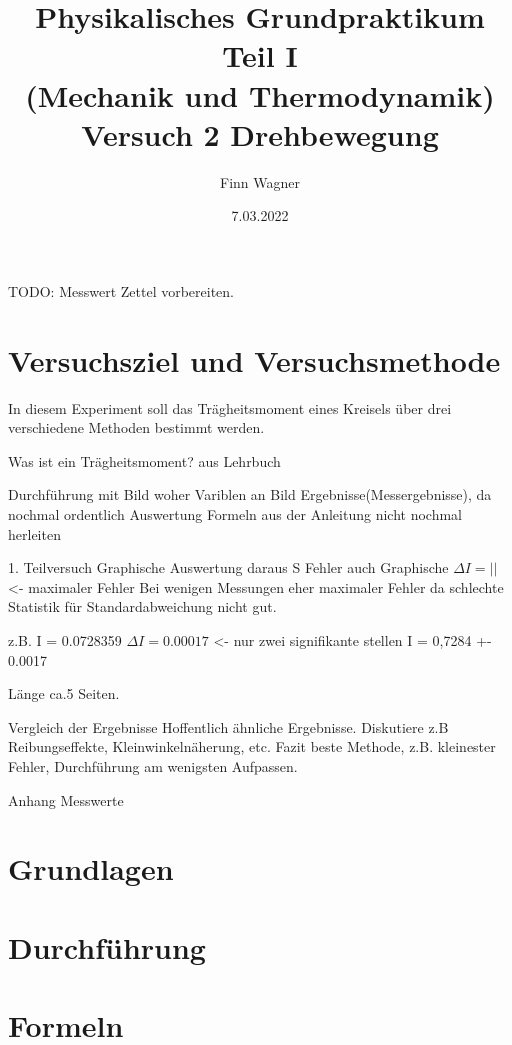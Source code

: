 \documentclass{article}
\date{7.03.2022}
\title{Physikalisches Grundpraktikum Teil I \\ (Mechanik und Thermodynamik) \\ Versuch 2 Drehbewegung}
\author{Finn Wagner}
\begin{document}
    \maketitle

    TODO: Messwert Zettel vorbereiten.
    \section{Versuchsziel und Versuchsmethode}
      In diesem Experiment soll das Trägheitsmoment eines Kreisels über drei verschiedene Methoden bestimmt werden.
      

      Was ist ein Trägheitsmoment? aus Lehrbuch

      Durchführung mit Bild woher Variblen an Bild
      Ergebnisse(Messergebnisse), da nochmal ordentlich
      Auswertung
      Formeln aus der Anleitung nicht nochmal herleiten


      1. Teilversuch Graphische Auswertung daraus S
      Fehler auch Graphische
      \( \Delta I = \left|\right| \) <- maximaler Fehler
      Bei wenigen Messungen eher maximaler Fehler da schlechte Statistik für Standardabweichung nicht gut.


      z.B. I = 0.0728359
      \( \Delta I = 0.00017 \) <- nur zwei signifikante stellen
      I = 0,7284 +- 0.0017

      Länge ca.5 Seiten.

    Vergleich der Ergebnisse
    Hoffentlich ähnliche Ergebnisse.
    Diskutiere z.B Reibungseffekte, Kleinwinkelnäherung, etc.
    Fazit beste Methode, z.B. kleinester Fehler, Durchführung am wenigsten Aufpassen.

    Anhang Messwerte

    \section{Grundlagen}

    \section{Durchführung}

    \section{Formeln}
\end{document}
